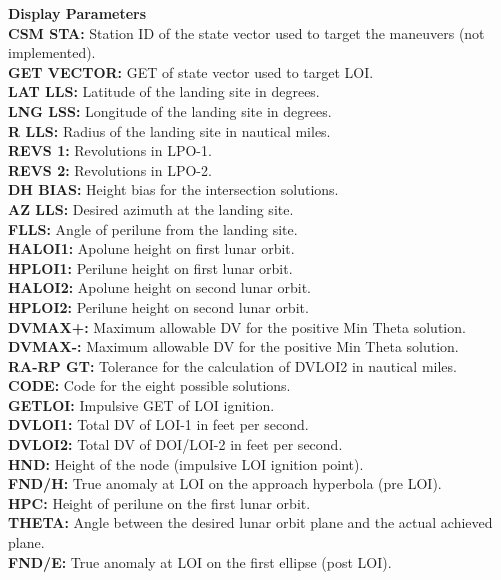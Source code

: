 \documentclass[11pt]{article} %
\begin{document}
\textbf{Display Parameters}\\
\textbf{CSM STA:} Station ID of the state vector used to target the maneuvers (not implemented).\\
\textbf{GET VECTOR:} GET of state vector used to target LOI.\\
\textbf{LAT LLS:} Latitude of the landing site in degrees.\\
\textbf{LNG LSS:} Longitude of the landing site in degrees.\\
\textbf{R LLS:} Radius of the landing site in nautical miles.\\
\textbf{REVS 1:} Revolutions in LPO-1.\\
\textbf{REVS 2:} Revolutions in LPO-2.\\
\textbf{DH BIAS:} Height bias for the intersection solutions.\\
\textbf{AZ LLS:} Desired azimuth at the landing site.\\
\textbf{FLLS:} Angle of perilune from the landing site.\\
\textbf{HALOI1:} Apolune height on first lunar orbit.\\
\textbf{HPLOI1:} Perilune height on first lunar orbit.\\
\textbf{HALOI2:} Apolune height on second lunar orbit.\\
\textbf{HPLOI2:} Perilune height on second lunar orbit.\\
\textbf{DVMAX+:} Maximum allowable DV for the positive Min Theta solution.\\
\textbf{DVMAX-:} Maximum allowable DV for the positive Min Theta solution.\\
\textbf{RA-RP GT:} Tolerance for the calculation of DVLOI2 in nautical miles.\\

\textbf{CODE:} Code for the eight possible solutions.\\
\textbf{GETLOI:} Impulsive GET of LOI ignition.\\
\textbf{DVLOI1:} Total DV of LOI-1 in feet per second.\\
\textbf{DVLOI2:} Total DV of DOI/LOI-2 in feet per second.\\
\textbf{HND:} Height of the node (impulsive LOI ignition point).\\
\textbf{FND/H:} True anomaly at LOI on the approach hyperbola (pre LOI).\\
\textbf{HPC:} Height of perilune on the first lunar orbit.\\
\textbf{THETA:} Angle between the desired lunar orbit plane and the actual achieved plane.\\
\textbf{FND/E:} True anomaly at LOI on the first ellipse (post LOI).\\
\newpage
\end{document}
